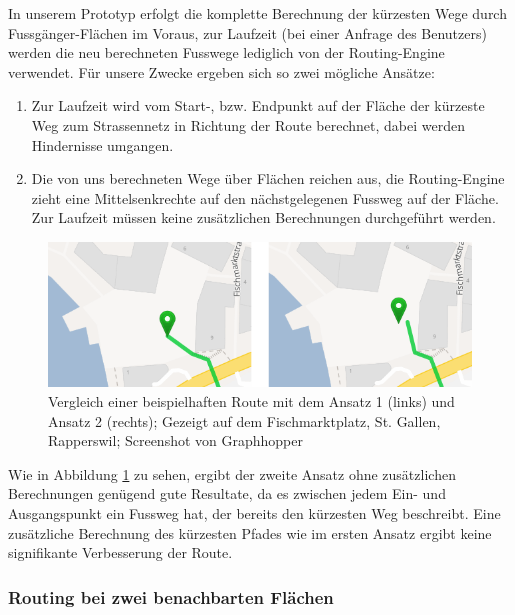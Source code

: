 In unserem Prototyp erfolgt die komplette Berechnung der kürzesten Wege durch Fussgänger-Flächen im Voraus, zur Laufzeit (bei einer Anfrage des Benutzers) werden die neu berechneten Fusswege lediglich von der Routing-Engine verwendet. Für unsere Zwecke ergeben sich so zwei mögliche Ansätze:

\begin{enumerate}
    \item Zur Laufzeit wird vom Start-, bzw. Endpunkt auf der Fläche der kürzeste Weg zum Strassennetz in Richtung der Route berechnet, dabei werden Hindernisse umgangen.
    \item Die von uns berechneten Wege über Flächen reichen aus, die Routing-Engine zieht eine Mittelsenkrechte auf den nächstgelegenen Fussweg auf der Fläche. Zur Laufzeit müssen keine zusätzlichen Berechnungen durchgeführt werden.
\end{enumerate}

\begin{figure}[ht]
    \centering
    \includegraphics[width=1\linewidth]{technicalreport/img/vergleich_start-punkt-auf-flaeche}
    \caption[Vergleich der Ansätze wenn Startpunkt auf Fläche]{Vergleich einer beispielhaften Route mit dem Ansatz 1 (links) und Ansatz 2 (rechts); Gezeigt auf dem Fischmarktplatz, St. Gallen, Rapperswil; Screenshot von Graphhopper \cite{graphhopper}}
    \label{fig:vergleich_start-punkt_auf_fläche}
\end{figure}


Wie in Abbildung \ref{fig:vergleich_start-punkt_auf_fläche} zu sehen, ergibt der zweite Ansatz ohne zusätzlichen Berechnungen genügend gute Resultate, da es zwischen jedem Ein- und Ausgangspunkt ein Fussweg hat, der bereits den kürzesten Weg beschreibt. Eine zusätzliche Berechnung des kürzesten Pfades wie im ersten Ansatz ergibt keine signifikante Verbesserung der Route.

\subsubsection{Routing bei zwei benachbarten Flächen}
\label{subsub:Routing bei zwei benachbarten Flächen}

